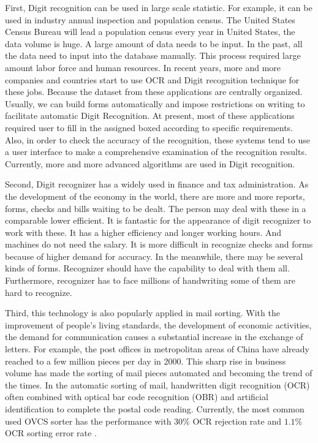 \documentclass[sigconf]{acmart}
\begin{document}
First, Digit recognition can be used in large scale statistic. For example, it can be used in industry annual inspection and population census\cite{app1}. The United States Census Bureau will lead a population census every year in United States, the data volume is huge. A large amount of data needs to be input. In the past, all the data  need to input into the database manually. This process required large amount labor force and human resources. In recent years, more and more companies and countries start to use OCR and Digit recognition technique for these jobs. Because the dataset from these applications are centrally organized. Usually, we can build forms automatically and impose restrictions on writing to facilitate automatic Digit Recognition. At present, most of these applications required user to fill in the assigned boxed according to specific requirements. Also, in order to check the accuracy of the recognition, these systems tend to use a user interface to make a comprehensive examination of the recognition results\cite{app2}. Currently, more and more advanced algorithms are used in Digit recognition.

Second, Digit recognizer has a widely used in finance and tax administration. As the development of the economy in the world, there are more and more reports, forms, checks and bills waiting to be dealt. The person may deal with these in a comparable lower efficient. It is fantastic for the appearance of digit recognizer to work with these\cite{second}. It has a higher efficiency and longer working hours. And machines do not need the salary. It is more difficult in recognize checks and forms because of higher demand for accuracy. In the meanwhile, there may be several kinds of forms. Recognizer should have the capability to deal with them all. Furthermore, recognizer has to face millions of handwriting some of them are hard to recognize\cite{99}.

Third, this technology is also popularly applied in mail sorting. With the improvement of people's living standards, the development of economic activities, the demand for communication causes a substantial increase in the exchange of letters. For example, the post offices in metropolitan areas of China have already reached to a few million pieces per day in 2000. This sharp rise in business volume has made the sorting of mail pieces automated and becoming the trend of the times. In the automatic sorting of mail, handwritten digit recognition (OCR) often combined with optical bar code recognition (OBR) and artificial identification to complete the postal code reading. Currently, the most common used OVCS sorter has the performance with $30\%$ OCR rejection rate and $1.1\%$ OCR sorting error rate \cite{hdwc}.
\end{document}
